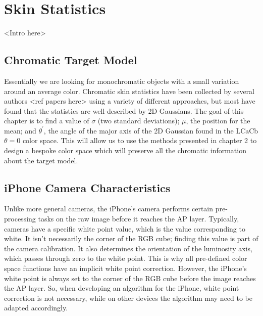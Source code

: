 
\chapter{Skin Statistics}\label{sec:ChapSkin}
\ifpdf
    \graphicspath{{Chapter3/Figs/Raster/}{Chapter3/Figs/PDF/}{Chapter3/Figs/}}
\else
    \graphicspath{{Chapter3/Figs/Vector/}{Chapter3/Figs/}}
\fi



<Intro here>

\section{Chromatic Target Model}

Essentially we are looking for monochromatic objects with a small variation around an average color. Chromatic skin statistics have been collected by several authors <ref papers here> using a variety of different approaches, but most have found that the statistics are well-described by 2D Gaussians. The goal of this chapter is to find a value of $\sigma$ (two standard deviations); $\mu$, the position for the mean; and $\theta^\prime$, the angle of the major axis of the 2D Gaussian found in the LCaCb $\theta = 0$ color space. This will allow us to use the methods presented in chapter 2 to design a bespoke color space which will preserve all the chromatic information about the target model.

\section{iPhone Camera Characteristics} \label{sec:iPhoneCameraCharacteristics}

Unlike more general cameras, the iPhone's camera performs certain pre-processing tasks on the raw image before it reaches the AP layer. Typically, cameras have a specific white point value, which is the value corresponding to white. It isn't necessarily the corner of the RGB cube; finding this value is part of the camera calibration. It also determines the orientation of the luminosity axis, which passes through zero to the white point. This is why all pre-defined color space functions have an implicit white point correction. However, the iPhone's white point is always set to the corner of the RGB cube before the image reaches the AP layer. So, when developing an algorithm for the iPhone, white point correction is not necessary, while on other devices the algorithm may need to be adapted accordingly.

